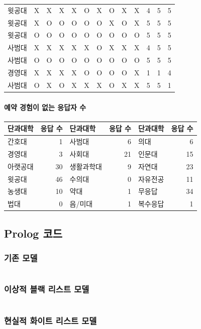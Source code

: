 \documentclass[11pt,a4paper]{article}
\begin{document}
\begin{center}
\begin{supertabular}{ | p{2cm} | x{0.5cm} | x{0.5cm} | x{0.5cm} | x{0.5cm} | x{0.5cm} | x{0.5cm} | x{0.5cm} | x{0.5cm} | x{0.5cm} | x{0.5cm} | x{0.5cm} | x{0.5cm} | }
윗공대 & X & X & X & X & O & X & O & X & X & 4 & 5 & 5 \\
윗공대 & X & O & O & O & O & O & X & O & X & 5 & 5 & 5 \\
윗공대 & O & O & O & O & O & O & O & O & O & 5 & 5 & 5 \\
사범대 & X & X & X & X & X & O & X & X & X & 4 & 5 & 5 \\
사범대 & O & O & O & O & O & O & O & O & O & 5 & 5 & 5 \\
경영대 & X & X & X & X & O & O & O & O & X & 1 & 1 & 4 \\
사범대 & O & X & O & X & X & X & O & X & X & 5 & 5 & 1 \\
\hline
\end{supertabular}
\end{center}
\paragraph{예약 경험이 없는 응답자 수}
\begin{center}
\begin{tabular}{ | p{2cm} | r || p{2cm} | r || p{2cm} | r | }
\hline
단과대학 & 응답 수 & 단과대학 & 응답 수 & 단과대학 & 응답 수 \\
\hline
간호대 & 1 & 사범대 & 6 & 의대 & 6 \\
경영대 & 3 & 사회대 & 21 & 인문대 & 15 \\
아랫공대 & 30 & 생활과학대 & 9 & 자연대 & 23 \\
윗공대 & 46 & 수의대 & 0 & 자유전공 & 11 \\
농생대 & 10 & 약대 & 1 & 무응답 & 34 \\
법대 & 0 & 음/미대 & 1 & 복수응답 & 1 \\
\hline
\end{tabular}
\end{center}

\subsection{Prolog 코드}
\subsubsection{기존 모델}
\inputminted[fontsize=\footnotesize]{prolog}{prev_model.pl}
\subsubsection{이상적 블랙 리스트 모델}
\inputminted[fontsize=\footnotesize]{prolog}{black_model.pl}
\subsubsection{현실적 화이트 리스트 모델}
\inputminted[fontsize=\footnotesize]{prolog}{white_model.pl}
\end{document}
